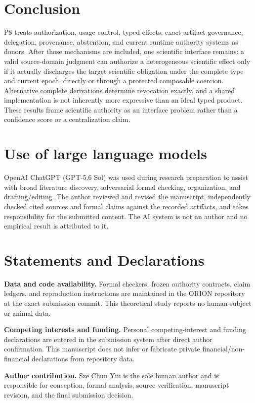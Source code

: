 \documentclass[11pt]{article}
\begin{document}
\section{Conclusion}
P8 treats authorization, usage control, typed effects, exact-artifact governance, delegation, provenance, abstention, and current runtime authority systems as donors. After those mechanisms are included, one scientific interface remains: a valid source-domain judgment can authorize a heterogeneous scientific effect only if it actually discharges the target scientific obligation under the complete type and current epoch, directly or through a protected composable coercion. Alternative complete derivations determine revocation exactly, and a shared implementation is not inherently more expressive than an ideal typed product. These results frame scientific authority as an interface problem rather than a confidence score or a centralization claim.

\section*{Use of large language models}
OpenAI ChatGPT (GPT-5.6 Sol) was used during research preparation to assist with broad literature discovery, adversarial formal checking, organization, and drafting/editing. The author reviewed and revised the manuscript, independently checked cited sources and formal claims against the recorded artifacts, and takes responsibility for the submitted content. The AI system is not an author and no empirical result is attributed to it.

\section*{Statements and Declarations}
\textbf{Data and code availability.} Formal checkers, frozen authority contracts, claim ledgers, and reproduction instructions are maintained in the ORION repository at the exact submission commit. This theoretical study reports no human-subject or animal data.

\textbf{Competing interests and funding.} Personal competing-interest and funding declarations are entered in the submission system after direct author confirmation. This manuscript does not infer or fabricate private financial/non-financial declarations from repository data.

\textbf{Author contribution.} Sze Chun Yiu is the sole human author and is responsible for conception, formal analysis, source verification, manuscript revision, and the final submission decision.
\end{document}
